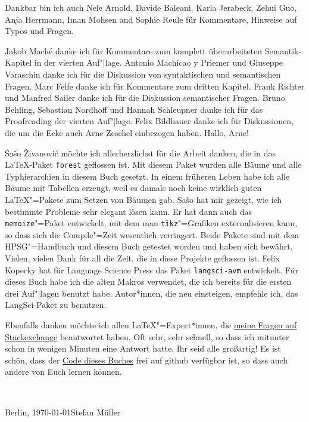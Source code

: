 Dankbar bin ich auch Nele Arnold, Davide Baleani, Karla Jerabeck, Zehui Guo, Anja Herrmann, Iman
Mohsen and Sophie Reule für Kommentare, Hinweise auf Typos und Fragen. 

Jakob Maché danke ich für Kommentare zum komplett überarbeiteten Semantik-Kapitel in der vierten Auf"|lage.
Antonio Machicao y Priemer und Giuseppe Varaschin danke ich für die Diskussion von syntaktischen und
semantischen Fragen. Marc Felfe danke ich für Kommentare zum dritten Kapitel. Frank Richter und Manfred Sailer
danke ich für die Diskussion semantischer Fragen.
Bruno Behling, Sebastian Nordhoff und Hannah Schleupner danke ich für das Proofreading der vierten Auf"|lage.
Felix Bildhauer danke ich für Diskussionen, die um die Ecke auch Arne Zeschel einbezogen
haben. Hallo, Arne!

Sašo Živanović möchte ich allerherzlichst für die Arbeit danken, die in das \LaTeX-Paket \texttt{forest} geflossen
ist. Mit diesem Paket wurden alle Bäume und alle Typhierarchien in diesem Buch gesetzt. In einem
früheren Leben habe ich alle Bäume mit Tabellen erzeugt, weil es damals noch keine wirklich guten
\LaTeX"=Pakete zum Setzen von Bäumen gab. Sašo hat mir gezeigt, wie ich bestimmte Probleme sehr
elegant lösen kann. Er hat dann auch das \texttt{memoize}"=Paket entwickelt, mit dem man \texttt{tikz}"=Grafiken
externalisieren kann, so dass sich die Compile"=Zeit wesentlich verringert. Beide Pakete sind mit dem
HPSG"=Handbuch und diesem Buch getestet worden und haben sich bewährt. Vielen, vielen Dank für all die Zeit,
die in diese Projekte geflossen ist. Felix Kopecky hat für Language Science Press das Paket
\texttt{langsci-avm} entwickelt. Für dieses Buch habe ich die alten Makros verwendet, die ich
bereits für die ersten drei Auf"|lagen benutzt habe. Autor*innen, die neu einsteigen, empfehle ich,
das LangSci-Paket zu benutzen.

Ebenfalls danken möchte ich allen \LaTeX"=Expert*innen, die \href{https://tex.stackexchange.com/users/18561/stefan-m%c3%bcller?tab=questions}{meine Fragen auf Stackexchange}
beantwortet haben. Oft sehr, sehr schnell, so dass ich mitunter schon in wenigen Minuten eine
Antwort hatte. Ihr seid alle großartig! Es ist schön, dass der
\href{https://github.com/langsci/535}{Code dieses Buches} frei auf github verfügbar ist, so dass auch andere von Euch lernen können.


~\medskip

\noindent
Berlin, \today\hfill Stefan Müller
